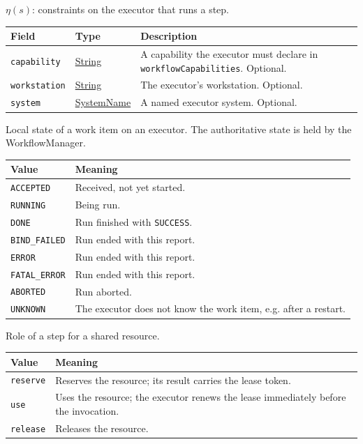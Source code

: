\documentclass[a4paper]{arrowhead}
\newcommand{\pref}[1]{{\textcolor{ArrowheadGrey}{\hyperref[sec:model:primitives:#1]{#1}}}}
\begin{document}
$\eta(s)$: constraints on the executor that runs a step.

{\small
\begin{longtable}{|p{3.9cm}|p{4.4cm}|p{7.5cm}|}

\hline
\rowcolor{gray!33} Field & Type & Description \\ \hline
\endhead
\texttt{capability} & \pref{String} & A capability the executor must declare in \texttt{workflow\allowbreak{}Capabilities}. Optional. \\ \hline
\texttt{workstation} & \pref{String} & The executor's workstation. Optional. \\ \hline
\texttt{system} & \pref{SystemName} & A named executor system. Optional. \\ \hline
\end{longtable}
}

Local state of a work item on an executor. The authoritative state is held by the WorkflowManager.

{\small
\begin{longtable}{|p{3.9cm}|p{11.9cm}|}

\hline
\rowcolor{gray!33} Value & Meaning \\ \hline
\endhead
\texttt{ACCEPTED} & Received, not yet started. \\ \hline
\texttt{RUNNING} & Being run. \\ \hline
\texttt{DONE} & Run finished with \texttt{SUCCESS}. \\ \hline
\texttt{BIND\_FAILED} & Run ended with this report. \\ \hline
\texttt{ERROR} & Run ended with this report. \\ \hline
\texttt{FATAL\_ERROR} & Run ended with this report. \\ \hline
\texttt{ABORTED} & Run aborted. \\ \hline
\texttt{UNKNOWN} & The executor does not know the work item, e.g. after a restart. \\ \hline
\end{longtable}
}

Role of a step for a shared resource.

{\small
\begin{longtable}{|p{3.9cm}|p{11.9cm}|}

\hline
\rowcolor{gray!33} Value & Meaning \\ \hline
\endhead
\texttt{reserve} & Reserves the resource; its result carries the lease token. \\ \hline
\texttt{use} & Uses the resource; the executor renews the lease immediately before the invocation. \\ \hline
\texttt{release} & Releases the resource. \\ \hline
\end{longtable}
}
\end{document}
